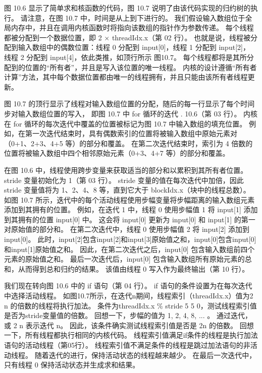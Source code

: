 图 10.6 显示了简单求和核函数的代码，图 10.7 说明了由该代码实现的归约树的执行。 
请注意，在图 10.7 中，时间是从上到下进行的。 
我们假设输入数组位于全局内存中，并且在调用内核函数时将指向该数组的指针作为参数传递。 
每个线程都被分配到一个数据位置，即 2 × threadIdx.x（第 02 行）。 
也就是说，线程被分配到输入数组中的偶数位置：线程 0 分配到 input[0]，线程 1 分配到 input[2]，
线程 2 分配到 input[4]，依此类推，如顶行所示 图10.7。 
每个线程都将是其所分配到的位置的“所有者”，并且是写入该位置的唯一线程。 
内核的设计遵循“所有者计算”方法，其中每个数据位置都由唯一的线程拥有，并且只能由该所有者线程更新。

图 10.7 的顶行显示了线程对输入数组位置的分配，随后的每一行显示了每个时间步对输入数组位置的写入，
即图 10.7 中 for 循环的迭代 . 10.6（第 03 行）。 
内核在 for 循环的每次迭代中覆盖的位置被标记为图 10.7 中输入数组的填充位置。 
例如，在第一次迭代结束时，具有偶数索引的位置将被输入数组中原始元素对（0+1、2+3、4+5 等）的部分和覆盖。 
在第二次迭代结束时，索引为 4 倍数的位置将被输入数组中四个相邻原始元素（0+3、4+7 等）的部分和覆盖。

在图 10.6 中，线程使用跨步变量来获取适当的部分和以累积到其所有者位置。 stride 变量初始化为 1（第 03 行）。 
stride 变量的值在每次迭代中加倍，因此 stride 变量值将为 1、2、4、8 等，直到它大于 blockIdx.x（块中的线程总数）。 
如图 10.7 所示，迭代中的每个活动线程使用步幅变量将步幅距离的输入数组元素添加到其拥有的位置。 
例如，在迭代 1 中，线程 0 使用步幅值 1 将 input[1] 添加到其拥有的位置 input[0] 中。 
这会将 input[0] 更新为 input[0] 和 input[1] 的第一对原始值的部分和。 
在第二次迭代中，线程 0 使用步幅值 2 将 input[2] 添加到 input[0]。 
此时，input[2]包含input[2]和input[3]原始值之和，input[0]包含input[0]和input[1]原始值之和。 
因此，在第二次迭代之后，input[0] 包含输入数组前四个元素的原始值之和。 
最后一次迭代后，input[0] 包含输入数组所有原始元素的总和，从而得到总和归约的结果。 
该值由线程 0 写入作为最终输出（第 10 行）。

我们现在转向图 10.6 中的 if 语句（第 04 行）。 if 语句的条件设置为在每次迭代中选择活动线程。 
如图10.7所示，在迭代n期间，线程索引（threadIdx.x）值为2 n 的倍数的线程将执行加法。 
条件为threadIdx.x \% stride 5 5 0，测试线程索引值是否为stride变量值的倍数。 
回想一下，步幅的值为 1, 2, 4, 8, ... 。 通过迭代，或 2 n 表示迭代 n。 
因此，该条件确实测试线程索引值是否是 2n 的倍数。 回想一下，所有线程都执行相同的内核代码。 
线程索引值满足if条件的线程是执行加法语句的活动线程（第05行）。 线程索引值不满足条件的线程是跳过加法语句的非活动线程。 
随着迭代的进行，保持活动状态的线程越来越少。 在最后一次迭代中，只有线程 0 保持活动状态并生成求和结果。

